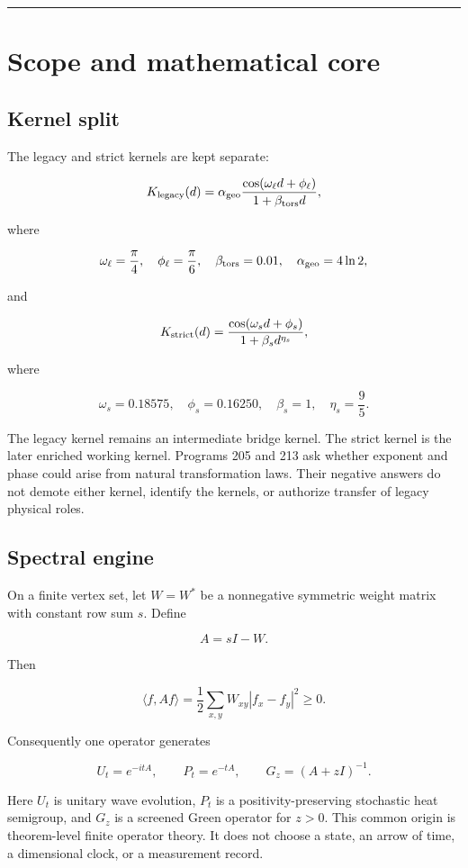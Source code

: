 \documentclass[11pt,a4paper,openany]{report}
\begin{document}
\par\medskip\hrule\medskip

\chapter{Scope and mathematical core}

\section{Kernel split}

The legacy and strict kernels are kept separate:

\[
K_{\rm legacy}(d)=
\alpha_{\rm geo}
\frac{\cos(\omega_\ell d+\phi_\ell)}
{1+\beta_{\rm tors}d},
\]

where

\[
\omega_\ell=\frac{\pi}{4},
\quad
\phi_\ell=\frac{\pi}{6},
\quad
\beta_{\rm tors}=0.01,
\quad
\alpha_{\rm geo}=4\ln2,
\]

and

\[
K_{\rm strict}(d)=
\frac{\cos(\omega_s d+\phi_s)}
{1+\beta_s d^{\eta_s}},
\]

where

\[
\omega_s=0.18575,
\quad
\phi_s=0.16250,
\quad
\beta_s=1,
\quad
\eta_s=\frac95.
\]

The legacy kernel remains an intermediate bridge kernel. The strict kernel is the later enriched working kernel. Programs 205 and 213 ask whether exponent and phase could arise from natural transformation laws. Their negative answers do not demote either kernel, identify the kernels, or authorize transfer of legacy physical roles.

\section{Spectral engine}

On a finite vertex set, let \(W=W^*\) be a nonnegative symmetric weight matrix with constant row sum \(s\). Define

\[
A=sI-W.
\]

Then

\[
\langle f,Af\rangle
=
\frac12\sum_{x,y}W_{xy}|f_x-f_y|^2\ge0.
\]

Consequently one operator generates

\[
U_t=e^{-itA},
\qquad
P_t=e^{-tA},
\qquad
G_z=(A+zI)^{-1}.
\]

Here \(U_t\) is unitary wave evolution, \(P_t\) is a positivity-preserving stochastic heat semigroup, and \(G_z\) is a screened Green operator for \(z>0\). This common origin is theorem-level finite operator theory. It does not choose a state, an arrow of time, a dimensional clock, or a measurement record.
\end{document}
